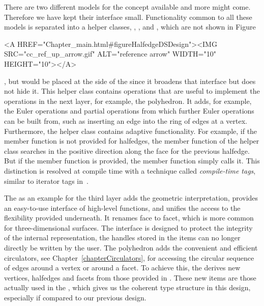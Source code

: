 There are two different models for the  concept
available and more might come. Therefore we have kept their interface
small. Functionality common to all these models is separated into a
helper classes, , , 
and  , which are not shown in 
Figure~\ccTexHtml{\ref{figureHalfedgeDSDesign}}{}\begin{ccHtmlOnly}
  <A HREF="Chapter_main.html#figureHalfedgeDSDesign"><IMG 
  SRC="cc_ref_up_arrow.gif" ALT="reference arrow" WIDTH="10" HEIGHT="10"></A>
\end{ccHtmlOnly}, but would be placed at the
side of the  since it broadens that
interface but does not hide it.  This helper class contains operations
that are useful to implement the operations in the next layer, for
example, the polyhedron. It adds, for example, the Euler operations and
partial operations from which further Euler operations can be built
from, such as inserting an edge into the ring of edges at a vertex.
Furthermore, the helper class contains adaptive functionality.  For
example, if the  member function is not provided for
halfedges, the  member function of the helper class
searches in the positive direction along the face for the previous
halfedge. But if the  member function is provided, the
 member function simply calls it. This distinction
is resolved at compile time with a technique called {\em
  compile-time tags}, similar to iterator tags in~\cite{sl-stl-95}.

The  as an example for the third layer adds the
geometric interpretation, provides an easy-to-use interface of
high-level functions, and unifies the access to the flexibility
provided underneath.  It renames face to facet, which is more common
for three-dimensional surfaces.  The interface is designed to protect
the integrity of the internal representation, the handles stored in
the items can no longer directly be written by the user.  The
polyhedron adds the convenient and efficient circulators, see
Chapter~\ref{chapterCirculators}, for accessing the circular sequence
of edges around a vertex or around a facet. To achieve this, the
 derives new vertices, halfedges and facets from those
provided in .  These new items are those actually used in
the , which gives us the coherent type
structure in this design, especially if compared to our previous
design.



